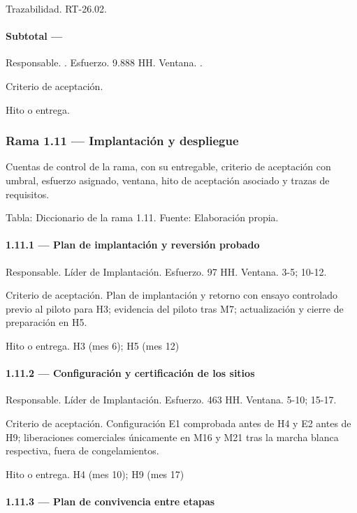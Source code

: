 \documentclass[11pt]{article}
\begin{document}
Trazabilidad. RT-26.02.

\paragraph{Subtotal — }

Responsable. . Esfuerzo. 9.888 HH. Ventana. .

Criterio de aceptación.

Hito o entrega.

\subsubsection{Rama 1.11 — Implantación y despliegue}

Cuentas de control de la rama, con su entregable, criterio de aceptación con umbral, esfuerzo asignado, ventana, hito de aceptación asociado y trazas de requisitos.

Tabla: Diccionario de la rama 1.11. Fuente: Elaboración propia.

\paragraph{1.11.1 — Plan de implantación y reversión probado}

Responsable. Líder de Implantación. Esfuerzo. 97 HH. Ventana. 3-5; 10-12.

Criterio de aceptación. Plan de implantación y retorno con ensayo controlado previo al piloto para H3; evidencia del piloto tras M7; actualización y cierre de preparación en H5.

Hito o entrega. H3 (mes 6); H5 (mes 12)

\paragraph{1.11.2 — Configuración y certificación de los sitios}

Responsable. Líder de Implantación. Esfuerzo. 463 HH. Ventana. 5-10; 15-17.

Criterio de aceptación. Configuración E1 comprobada antes de H4 y E2 antes de H9; liberaciones comerciales únicamente en M16 y M21 tras la marcha blanca respectiva, fuera de congelamientos.

Hito o entrega. H4 (mes 10); H9 (mes 17)

\paragraph{1.11.3 — Plan de convivencia entre etapas}
\end{document}
